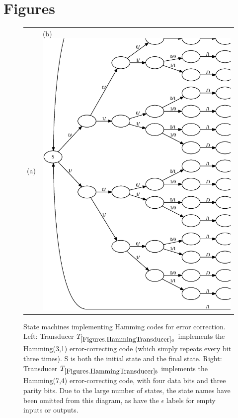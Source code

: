 \documentclass[english]{article}
\begin{document}
\newpage
\section{Figures}

\newpage
\begin{figure}[h!t]
\begin{tabular}{ll}
(a) {hamming31}{width=.45\textwidth}
&
(b) \includegraphics[width=.45\textwidth]{hamming74.ps}
\end{tabular}
\caption{ 
State machines implementing Hamming codes for error correction.
Left:
Transducer $\hammingthreeone$ implements the Hamming(3,1) error-correcting code
(which simply repeats every bit three times).
S is both the initial state and the final state.
Right:
Transducer $\hammingsevenfour$ implements the Hamming(7,4) error-correcting code,
with four data bits and three parity bits.
Due to the large number of states, the state names have been omitted from this diagram,
as have the $\epsilon$ labels for empty inputs or outputs.
}
\end{figure}

\newpage
{}
\end{document}
